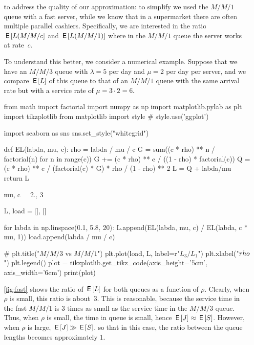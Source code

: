 \documentclass[queueing-book.tex]{subfiles}
\begin{document}
 to address the quality of our approximation: to simplify we used the $M/M/1$ queue with a fast server, while we know that in a supermarket there are often multiple parallel cashiers. Specifically, we are interested in the ratio $\,\mathsf{E}\left[L(M/M/c\right]$ and $\,\mathsf{E}\left[L(M/M/1)\right]$ where in the $M/M/1$ queue the server works at rate~$c$.

To understand this better, we consider a numerical example.
Suppose that we have an $M/M/3$ queue with $\lambda = 5$ per day and $\mu=2$ per day per server, and we compare $\,\mathsf{E}\left[L\right]$ of this queue to that of an $M/M/1$ queue with the same arrival rate but with a service rate of $\mu = 3\cdot 2 = 6$.
\begin{marginfigure}
\begin{pycode}[ratio]
from math import factorial
import numpy as np
import matplotlib.pylab as plt
import tikzplotlib
from matplotlib import style
# style.use('ggplot')

import seaborn as sns
sns.set_style("whitegrid")


def EL(labda, mu, c):
    rho = labda / mu / c
    G = sum((c * rho) ** n / factorial(n) for n in range(c))
    G += (c * rho) ** c / ((1 - rho) * factorial(c))
    Q = (c * rho) ** c / (factorial(c) * G) * rho / (1 - rho) ** 2
    L = Q + labda/mu
    return L


mu, c = 2., 3

L, load = [], []

for labda in np.linspace(0.1, 5.8, 20):
    L.append(EL(labda, mu, c) / EL(labda, c * mu, 1))
    load.append(labda / mu / c)

# plt.title("$M/M/3$ vs $M/M/1$")
plt.plot(load, L, label=r"$L_3/L_1$")
plt.xlabel("$\\rho$")
plt.legend()
plot = tikzplotlib.get_tikz_code(axis_height='5cm',
                                 axis_width='6cm')
print(plot)
\end{pycode}
\caption{The ratio of $\E\L$ for the $M/M/3$ and $M/M/1$ queue.}
\label{fig:fast}
\end{marginfigure}

\cref{fig:fast} shows  the ratio of $\E\L$ for both queues as a function of $\rho$.
Clearly, when $\rho$ is small, this ratio is about~$3$.
This is reasonable, because the service time in the fast $M/M/1$ is 3 times as small as the service time in the $M/M/3$ queue.  Thus, when $\rho$ is small, the time in queue is small, hence $\,\mathsf{E}\left[J\right] \approx \,\mathsf{E}\left[S\right]$.
However, when $\rho$ is large, $\,\mathsf{E}\left[J\right] \gg \,\mathsf{E}\left[S\right]$, so that in this case, the ratio between the queue lengths becomes approximately 1.
\end{document}
